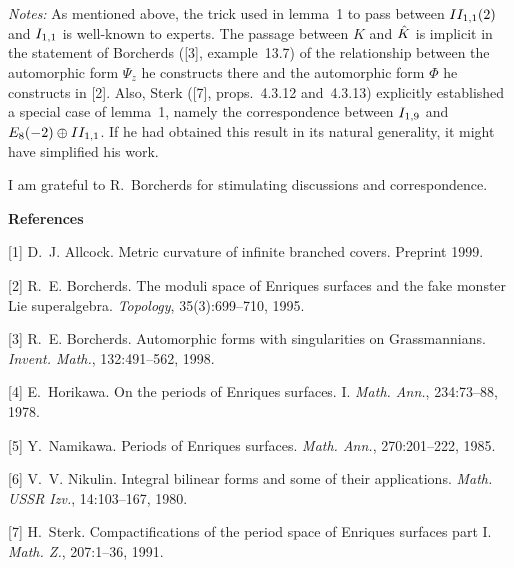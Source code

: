 \medskip
{\it Notes:} As mentioned above, the trick used in lemma~1 to
pass between $\II1,1(2)$ and $\I1,1$ is
well-known to experts. 
The passage between $K$ and $\hat{K}$ is
implicit in the statement of Borcherds ([3], example~13.7) of the
relationship between the automorphic form $\Psi_z$ he constructs
there and the automorphic form $\Phi$ he constructs in [2].  
Also, Sterk ([7], props.~4.3.12 and~4.3.13) explicitly
established a special case of lemma~1, namely the correspondence
between $\I1,9$ and $E_8(-2)\oplus\II1,1$. If he had obtained
this result in its natural generality, it might have simplified
his work.

I am grateful to R.~Borcherds for stimulating discussions
and correspondence.

\bigskip
\noindent
{\bf References}
\medskip

\item{[1]}
D.~J. Allcock.
 Metric curvature of infinite branched covers.
 Preprint 1999.

\item{[2]}
R.~E. Borcherds.
 The moduli space of {E}nriques surfaces and the fake monster {L}ie
  superalgebra.
 {\it Topology}, 35(3):699--710, 1995.

\item{[3]}
R.~E. Borcherds.
 Automorphic forms with singularities on {G}rassmannians.
 {\it Invent. Math.}, 132:491--562, 1998.

\item{[4]}
E.~Horikawa.
 On the periods of {E}nriques surfaces. {I}.
 {\it Math. Ann.}, 234:73--88, 1978.

\item{[5]}
Y.~Namikawa.
 Periods of {E}nriques surfaces.
 {\it Math. Ann.}, 270:201--222, 1985.

\item{[6]}
V.~V. Nikulin. 
 Integral bilinear forms and some of their applications.
 {\it Math. USSR Izv.}, 14:103--167, 1980.

\item{[7]}
H.~Sterk.
 Compactifications of the period space of {E}nriques surfaces part I.
 {\it Math. Z.}, 207:1--36, 1991.

\bigskip
{}
\smallskip
{}
\bye
